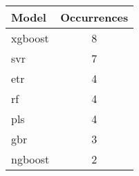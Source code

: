 \begin{tabular}{lc}
Model & Occurrences \\
\hline
\gls{xgboost} & 8 \\
\gls{svr} & 7 \\
\gls{etr} & 4 \\
\gls{rf} & 4 \\
\gls{pls} & 4 \\
\gls{gbr} & 3 \\
\gls{ngboost} & 2 \\
\hline
\end{tabular}
\label{tab:best_model_occurrences}

